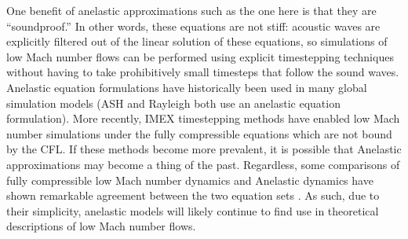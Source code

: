 One benefit of anelastic approximations such as the one here is that they are ``soundproof.''
In other words, these equations are not stiff: acoustic waves are explicitly filtered out of the linear solution of these equations, so simulations of low Mach number flows can be performed using explicit timestepping techniques without having to take prohibitively small timesteps that follow the sound waves.
Anelastic equation formulations have historically been used in many global simulation models (ASH and Rayleigh both use an anelastic equation formulation).
More recently, IMEX timestepping methods have enabled low Mach number simulations under the fully compressible equations which are not bound by the CFL.
If these methods become more prevalent, it is possible that Anelastic approximations may become a thing of the past.
Regardless, some comparisons of fully compressible low Mach number dynamics and Anelastic dynamics have shown remarkable agreement between the two equation sets \citep[see e.g.,][and chapter \ref{ch:alb19}]{lecoanet&all2014, andersLB2019}.
As such, due to their simplicity, anelastic models will likely continue to find use in theoretical descriptions of low Mach number flows.

